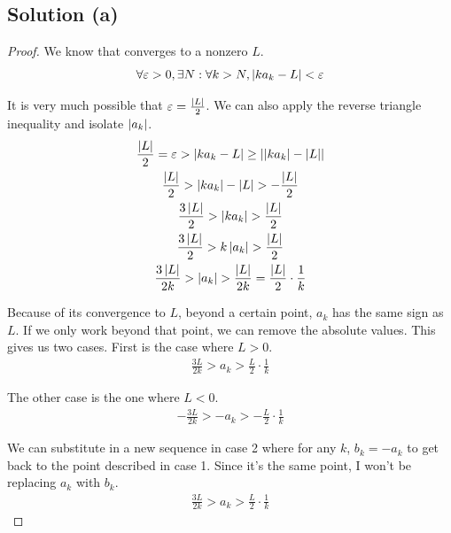 \documentclass[12pt]{report}
\begin{document}
    \subsection{Solution (a)}
        \begin{proof}
            We know that  converges to a nonzero $L$.
            \begin{equation}
                \forall\varepsilon > 0, \exists N : \forall k > N, \left| ka_k - L \right| < \varepsilon
            \end{equation}
    
            It is very much possible that $\varepsilon = \frac{\left| L \right|}{2}$.
            We can also apply the reverse triangle inequality and isolate $\left| a_k \right|$.
            \begin{gather}
                \frac{\left| L \right|}{2} = \varepsilon > \left| ka_k - L \right| \geq \left| \left| ka_k \right| - \left| L \right| \right|\\
                \frac{\left| L \right|}{2} > \left| ka_k \right| - \left| L \right| > -\frac{\left| L \right|}{2}\\
                \frac{3\left| L \right|}{2} > \left| ka_k \right| > \frac{\left| L \right|}{2}\\
                \frac{3\left| L \right|}{2} > k\left| a_k \right| > \frac{\left| L \right|}{2}\\
                \frac{3\left| L \right|}{2k} > \left| a_k \right| > \frac{\left| L \right|}{2k} = \frac{\left| L \right|}{2} \cdot \frac{1}{k}
            \end{gather}
    
            Because of its convergence to $L$, beyond a certain point, $a_k$ has the same sign as $L$.
            If we only work beyond that point, we can remove the absolute values.
            This gives us two cases.
            First is the case where $L > 0$.
            \begin{gather}
                \frac{3L}{2k} > a_k > \frac{L}{2} \cdot \frac{1}{k}
            \end{gather}
    
            The other case is the one where $L < 0$.
            \begin{gather}
                -\frac{3L}{2k} > -a_k > -\frac{L}{2} \cdot \frac{1}{k}
            \end{gather}
    
            We can substitute in a new sequence  in case 2 where for any $k$, $b_k = -a_k$ to get back to the point described in case 1.
            Since it's the same point, I won't be replacing $a_k$ with $b_k$.
            \begin{gather}
                \frac{3L}{2k} > a_k > \frac{L}{2} \cdot \frac{1}{k}
            \end{gather}
    

\end{proof}
\end{document}
